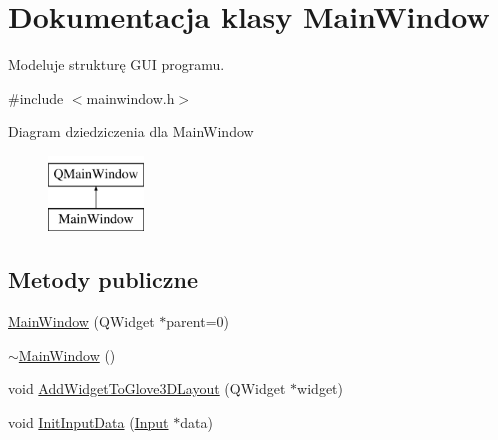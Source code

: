\hypertarget{class_main_window}{}\section{Dokumentacja klasy Main\+Window}
\label{class_main_window}


Modeluje strukturę G\+UI programu.  




{\ttfamily \#include $<$mainwindow.\+h$>$}

Diagram dziedziczenia dla Main\+Window\begin{figure}[H]
\begin{center}
\leavevmode
\includegraphics[height=2.000000cm]{class_main_window}
\end{center}
\end{figure}
\subsection*{Metody publiczne}
\begin{DoxyCompactItemize}
\item 
\hyperlink{class_main_window_a8b244be8b7b7db1b08de2a2acb9409db}{Main\+Window} (Q\+Widget $\ast$parent=0)
\item 
\hyperlink{class_main_window_ae98d00a93bc118200eeef9f9bba1dba7}{$\sim$\+Main\+Window} ()
\item 
void \hyperlink{class_main_window_ad1878f043e440b2917d12ed59caaca0c}{Add\+Widget\+To\+Glove3\+D\+Layout} (Q\+Widget $\ast$widget)
\item 
void \hyperlink{class_main_window_abd0772bfb398165834c0693627603b0f}{Init\+Input\+Data} (\hyperlink{class_input}{Input} $\ast$data)
\end{DoxyCompactItemize}

